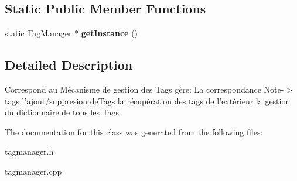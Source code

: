 \subsection*{\-Static \-Public \-Member \-Functions}
\begin{DoxyCompactItemize}
\item 
\hypertarget{classTagManager_af7de9966f3731509eef656f015df32c8}{static \hyperlink{classTagManager}{\-Tag\-Manager} $\ast$ {\bfseries get\-Instance} ()}\label{classTagManager_af7de9966f3731509eef656f015df32c8}

\end{DoxyCompactItemize}


\subsection{\-Detailed \-Description}
\-Correspond au \-Mécanisme de gestion des \-Tags gère\-: \-La correspondance \-Note-\/$>$tags l'ajout/suppresion de\-Tags la récupération des tags de l'extérieur la gestion du dictionnaire de tous les \-Tags 

\-The documentation for this class was generated from the following files\-:\begin{DoxyCompactItemize}
\item 
tagmanager.\-h\item 
tagmanager.\-cpp\end{DoxyCompactItemize}
